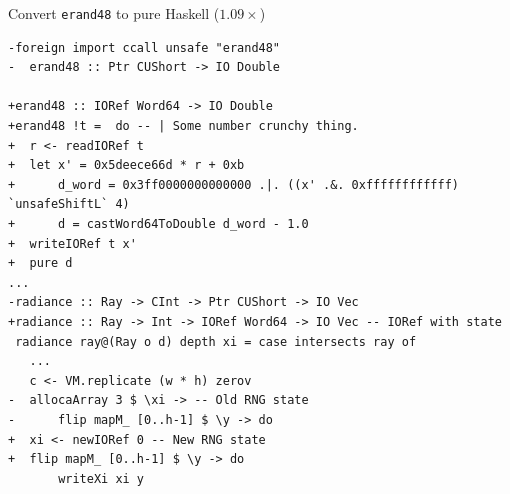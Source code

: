 \documentclass[8pt]{beamer}
\begin{document}
\begin{frame}[fragile]{Convert \texttt{erand48} to pure Haskell ($1.09\times$)}
\begin{verbatim}
-foreign import ccall unsafe "erand48"
-  erand48 :: Ptr CUShort -> IO Double

+erand48 :: IORef Word64 -> IO Double
+erand48 !t =  do -- | Some number crunchy thing.
+  r <- readIORef t
+  let x' = 0x5deece66d * r + 0xb
+      d_word = 0x3ff0000000000000 .|. ((x' .&. 0xffffffffffff) `unsafeShiftL` 4)
+      d = castWord64ToDouble d_word - 1.0
+  writeIORef t x'
+  pure d
...
-radiance :: Ray -> CInt -> Ptr CUShort -> IO Vec
+radiance :: Ray -> Int -> IORef Word64 -> IO Vec -- IORef with state
 radiance ray@(Ray o d) depth xi = case intersects ray of
   ...
   c <- VM.replicate (w * h) zerov
-  allocaArray 3 $ \xi -> -- Old RNG state
-      flip mapM_ [0..h-1] $ \y -> do
+  xi <- newIORef 0 -- New RNG state
+  flip mapM_ [0..h-1] $ \y -> do
       writeXi xi y
\end{verbatim}

\end{frame}
\end{document}
